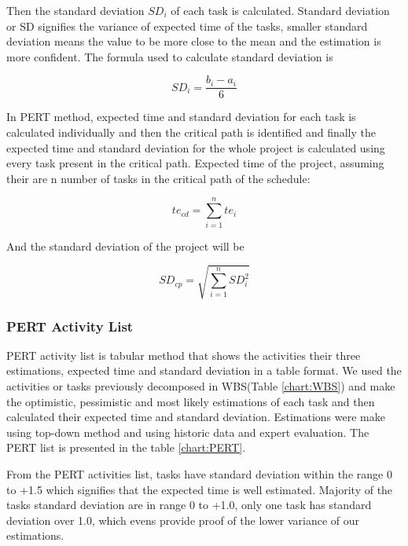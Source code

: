 \begin{spacing}{1}
Then the standard deviation $SD_{i}$ of each task is calculated. Standard deviation or SD signifies the variance of expected time of the tasks, smaller standard deviation means the value to be more close to the mean and the estimation is more confident. The formula used to calculate standard deviation is \newline

\begin{equation}
SD_{i} = \frac{b_{i} - a_{i}}{6} 
\end{equation}

In PERT method, expected time and standard deviation for each task is calculated individually and then the critical path is identified and finally the expected time and standard deviation for the whole project is calculated using every task present in the critical path.
Expected time of the project, assuming their are n number of tasks in the critical path of the schedule: \newline

\begin{equation} \label{eq:3}
 te_{cd} = \sum_{i=1}^{n}te_i
\end{equation}

 And the standard deviation of the project will be  \newline

\begin{equation}
SD_{cp} = \sqrt{\sum_{i=1}^{n} SD_i^2} 
\end{equation}

\subsubsection{PERT Activity List}
PERT activity list is tabular method that shows the activities their three estimations, expected time and standard deviation in a table format. We used the activities or tasks previously decomposed in WBS(Table \ref{chart:WBS}) and make the optimistic, pessimistic and most likely estimations of each task and then calculated their expected time and standard deviation. Estimations were make using top-down method and using historic data and expert evaluation. The PERT list is presented in the table \ref{chart:PERT}. 

From the PERT activities list, tasks have standard deviation within the range 0 to +1.5 which signifies that the expected time is well estimated. Majority of the tasks standard deviation are in range 0 to +1.0, only one task has standard deviation over 1.0, which evens provide proof of the lower variance of our estimations. 


\end{spacing}

